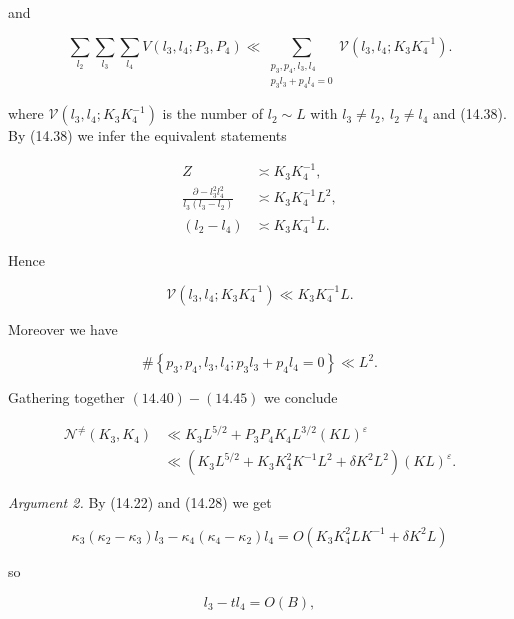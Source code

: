 \documentclass[10pt]{article}
\begin{document}
and


\begin{equation*}
\sum_{l_{2}}\sum_{l_{3}}\sum_{l_{4}}V(l_{3},l_{4};P_{3},P_{4})
\ll\sum_{\substack{p_{3},p_{4},l_{3},l_{4}\\ p_{3}l_{3}+p_{4}l_{4}=0}}
\mathscr{V}(l_{3},l_{4};K_{3}K_{4}^{-1}). \tag{14.43}
\end{equation*}


where $\mathscr{V}\left(l_{3}, l_{4} ; K_{3} K_{4}^{-1}\right)$ is the number of $l_{2} \sim L$ with $l_{3}\neq l_{2},\ l_{2}\neq l_{4}$ and (14.38). By (14.38) we infer the equivalent statements

$$
\begin{aligned}
Z & \asymp K_{3} K_{4}^{-1}, \\
\frac{\partial-l_{3}^{2} l_{4}^{2}}{l_{3}\left(l_{3}-l_{2}\right)} & \asymp K_{3}K_{4}^{-1}L^{2}, \\
\left(l_{2}-l_{4}\right) & \asymp K_{3} K_{4}^{-1} L .
\end{aligned}
$$

Hence


\begin{equation*}
\mathscr{V}\left(l_{3}, l_{4} ; K_{3} K_{4}^{-1}\right) \ll K_{3} K_{4}^{-1} L . \tag{14.44}
\end{equation*}


Moreover we have


\begin{equation*}
\#\left\{p_{3}, p_{4}, l_{3}, l_{4} ; p_{3} l_{3}+p_{4} l_{4}=0\right\} \ll L^{2} . \tag{14.45}
\end{equation*}


Gathering together $(14.40)-(14.45)$ we conclude


\begin{align*}
\mathscr{N}^{\neq}(K_{3},K_{4}) & \ll K_{3} L^{5 / 2}+P_{3} P_{4} K_{4} L^{3 / 2}(K L)^{\varepsilon} \\
& \ll\left(K_{3} L^{5 / 2}+K_{3} K_{4}^{2} K^{-1} L^{2}+\delta K^{2} L^{2}\right)(K L)^{\varepsilon} . \tag{14.46}
\end{align*}


\medskip\noindent\textit{Argument 2.} By (14.22) and (14.28) we get

$$
\kappa_{3}\left(\kappa_{2}-\kappa_{3}\right) l_{3}-\kappa_{4}\left(\kappa_{4}-\kappa_{2}\right) l_{4}=O\left(K_{3} K_{4}^{2} L K^{-1}+\delta K^{2} L\right)
$$

so


\begin{equation*}
l_{3}-t l_{4}=O(B), \tag{14.47}
\end{equation*}
\end{document}
